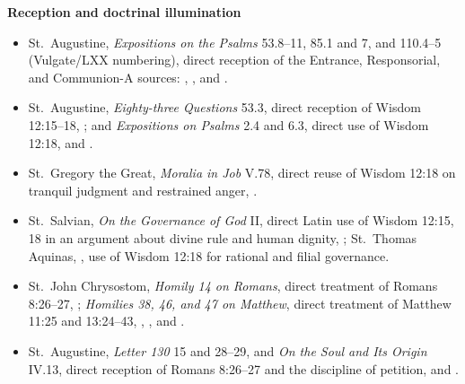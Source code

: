 \textbf{Reception and doctrinal illumination}
{\footnotesize
\begin{itemize}[itemsep=0em,topsep=0.15em,parsep=0pt]
\item St.~Augustine, \emph{Expositions on the Psalms} 53.8--11, 85.1 and 7, and 110.4--5 (Vulgate/LXX numbering), direct reception of the Entrance, Responsorial, and Communion-A sources: , , and .
\item St.~Augustine, \emph{Eighty-three Questions} 53.3, direct reception of Wisdom 12:15--18, ; and \emph{Expositions on Psalms} 2.4 and 6.3, direct use of Wisdom 12:18,  and .
\item St.~Gregory the Great, \emph{Moralia in Job} V.78, direct reuse of Wisdom 12:18 on tranquil judgment and restrained anger, .
\item St.~Salvian, \emph{On the Governance of God} II, direct Latin use of Wisdom 12:15, 18 in an argument about divine rule and human dignity, ; St.~Thomas Aquinas, , use of Wisdom 12:18 for rational and filial governance.
\item St.~John Chrysostom, \emph{Homily 14 on Romans}, direct treatment of Romans 8:26--27, ; \emph{Homilies 38, 46, and 47 on Matthew}, direct treatment of Matthew 11:25 and 13:24--43, , , and .
\item St.~Augustine, \emph{Letter 130} 15 and 28--29, and \emph{On the Soul and Its Origin} IV.13, direct reception of Romans 8:26--27 and the discipline of petition,  and .

\end{itemize}}
